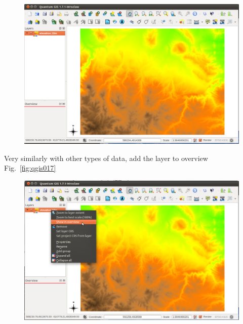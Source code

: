 \begin{figure}[htbp]
   \centering
   \includegraphics[scale=0.2]{qgis016.png}
   \caption{}
   \label{fig:qgis016}
\end{figure}

Very similarly with other types of data, add the layer to overview Fig.~\ref{fig:qgis017}

\begin{figure}[htbp]
   \centering
   \includegraphics[scale=0.2]{qgis017.png}
   \caption{}
   \label{fig:qgis0017}
\end{figure}

